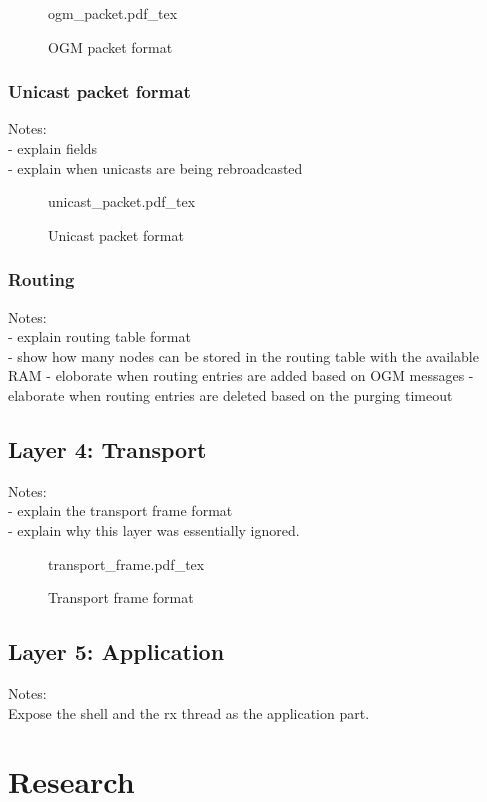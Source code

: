 \begin{figure}[H]
    \centering
    {ogm_packet.pdf_tex}
    \caption{OGM packet format}
\end{figure}

\subsection{Unicast packet format}
Notes:\\
- explain fields\\
- explain when unicasts are being rebroadcasted\\

\begin{figure}[H]
    \centering
    {unicast_packet.pdf_tex}
    \caption{Unicast packet format}
\end{figure}

\subsection{Routing}
Notes:\\
- explain routing table format\\
- show how many nodes can be stored in the routing table with the available RAM
- eloborate when routing entries are added based on OGM messages
- elaborate when routing entries are deleted based on the purging timeout

\section{Layer 4: Transport}
Notes:\\
- explain the transport frame format\\
- explain why this layer was essentially ignored.\\

\begin{figure}[H]
    \centering
    {transport_frame.pdf_tex}
    \caption{Transport frame format}
\end{figure}

\section{Layer 5: Application}
Notes:\\
Expose the shell and the rx thread as the application part.\\

\chapter{Research}
